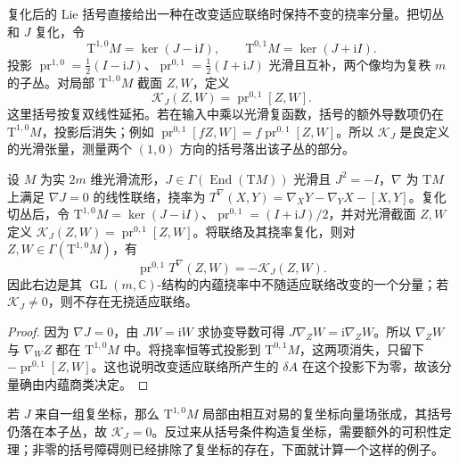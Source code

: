 \ProseParagraphBreak

复化后的 Lie 括号直接给出一种在改变适应联络时保持不变的挠率分量。把切丛和 \(J\) 复化，令
\[
	\mathrm{T}^{1,0}M=\ker(J-\mathrm iI),\qquad
	\mathrm{T}^{0,1}M=\ker(J+\mathrm iI).
\]
投影 \(\operatorname{pr}^{1,0}=\tfrac12(I-\mathrm iJ)\)、\(\operatorname{pr}^{0,1}=\tfrac12(I+\mathrm iJ)\) 光滑且互补，两个像均为复秩 \(m\) 的子丛。对局部 \(\mathrm{T}^{1,0}M\) 截面 \(Z,W\)，定义
\begin{equation}
	\label{g1:eq:almost-complex-bracket-obstruction}
	\mathcal K_J(Z,W)=\operatorname{pr}^{0,1}[Z,W].
\end{equation}
这里括号按复双线性延拓。若在输入中乘以光滑复函数，括号的额外导数项仍在 \(\mathrm{T}^{1,0}M\)，投影后消失；例如 \(\operatorname{pr}^{0,1}[fZ,W]=f\operatorname{pr}^{0,1}[Z,W]\)。所以 \(\mathcal K_J\) 是良定义的光滑张量，测量两个 \((1,0)\) 方向的括号落出该子丛的部分。

\begin{proposition}
	\label{g1:prop:almost-complex-intrinsic-component}
	设 \(M\) 为实 \(2m\) 维光滑流形，\(J\in\Gamma(\operatorname{End}(\mathrm TM))\) 光滑且 \(J^2=-I\)，\(\nabla\) 为 \(\mathrm TM\) 上满足 \(\nabla J=0\) 的线性联络，挠率为 \(T^\nabla(X,Y)=\nabla_XY-\nabla_YX-[X,Y]\)。复化切丛后，令 \(\mathrm T^{1,0}M=\ker(J-\mathrm iI)\)、\(\operatorname{pr}^{0,1}=(I+\mathrm iJ)/2\)，并对光滑截面 \(Z,W\) 定义 \(\mathcal K_J(Z,W)=\operatorname{pr}^{0,1}[Z,W]\)。将联络及其挠率复化，则对 \(Z,W\in\Gamma(\mathrm{T}^{1,0}M)\)，有
	\[
		\operatorname{pr}^{0,1}T^\nabla(Z,W)=-\mathcal K_J(Z,W).
	\]
	因此右边是其 \(\operatorname{GL}(m,\mathbb C)\)-结构的内蕴挠率中不随适应联络改变的一个分量；若 \(\mathcal K_J\neq0\)，则不存在无挠适应联络。
\end{proposition}
\begin{proof}
	因为 \(\nabla J=0\)，由 \(JW=\mathrm iW\) 求协变导数可得 \(J\nabla_ZW=\mathrm i\nabla_ZW\)。所以 \(\nabla_ZW\) 与 \(\nabla_WZ\) 都在 \(\mathrm{T}^{1,0}M\) 中。将挠率恒等式投影到 \(\mathrm{T}^{0,1}M\)，这两项消失，只留下 \(-\operatorname{pr}^{0,1}[Z,W]\)。这也说明改变适应联络所产生的 \(\delta A\) 在这个投影下为零，故该分量确由内蕴商类决定。
\end{proof}

若 \(J\) 来自一组复坐标，那么 \(\mathrm{T}^{1,0}M\) 局部由相互对易的复坐标向量场张成，其括号仍落在本子丛，故 \(\mathcal K_J=0\)。反过来从括号条件构造复坐标，需要额外的可积性定理；非零的括号障碍则已经排除了复坐标的存在，下面就计算一个这样的例子。

